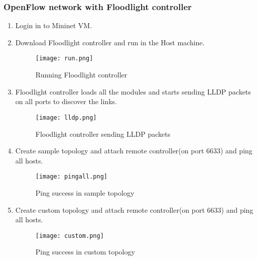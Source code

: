 \documentclass[12pt,a4paper]{article}
\begin{document}
\subsubsection{OpenFlow network with Floodlight controller}
\begin{enumerate}
\item Login in to Mininet VM.
\item Download Floodlight controller and run in the Host machine.


\begin{figure}[H]
\begin{center}

\texttt{[image: run.png]}
\end{center}
\caption{Running Floodlight controller}
\end{figure}



\item Floodlight controller loads all the modules and starts sending LLDP packets on all ports to discover the links.

\begin{figure}[H]
\begin{center}

\texttt{[image: lldp.png]}
\end{center}
\caption{Floodlight controller sending LLDP packets}
\end{figure}

\item Create sample topology and attach remote controller(on port 6633) and ping all hosts.
\begin{figure}[H]
\begin{center}

\texttt{[image: pingall.png]}
\end{center}
\caption{Ping success in sample topology}
\end{figure}

\item Create custom topology and attach remote controller(on port 6633) and ping all hosts.
\begin{figure}[H]
\begin{center}

\texttt{[image: custom.png]}
\end{center}
\caption{Ping success in custom topology}
\end{figure}

\end{enumerate}
\newpage
\end{document}
